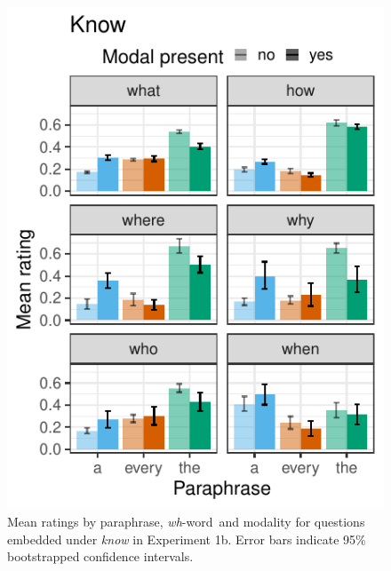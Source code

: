 \documentclass[12pt,letterpaper,table,svgnames,dvipsnames]{article}
\newcommand{\whw}{\emph{wh}-word~}
\begin{document}

\begin{figure}[h!]
\centering
\includegraphics[scale=1]{figures/modwh_know_context.pdf}
\caption{Mean ratings by paraphrase, \whw and modality for questions embedded under \emph{know} in Experiment 1b. Error bars indicate 95\% bootstrapped confidence intervals.} 
\label{ex1b_modXwh_know}
\end{figure}
\end{document}
